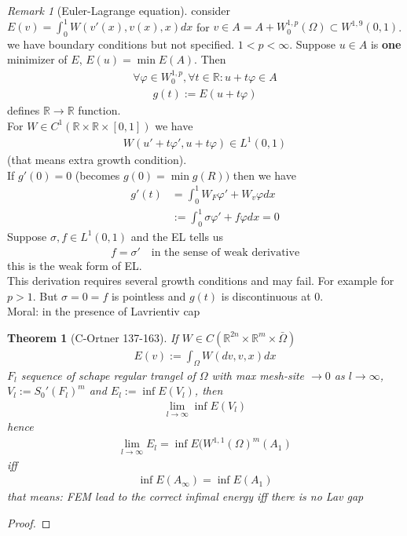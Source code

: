 \documentclass[a4paper,12pt,oneside,fleqn]{book}
\newtheorem{theorem}{Theorem}[section]
\theoremstyle{definition}
\theoremstyle{remark}
\newtheorem*{remark}{Remark}
\begin{document}
\begin{remark}[Euler-Lagrange equation]
	consider $E(v) = \int_0^1 W(v'(x), v(x), x)dx$ for $v \in A = A + W_0^{1, p}(\Omega) \subset W^{1, 9}(0, 1)$. 
	we have boundary conditions but not specified. $1 < p < \infty$. Suppose $u \in A$ is \textbf{one} minimizer of $E$, $E(u) = \min E(A)$. Then
	\begin{align*}
		\forall \varphi \in W^{1, p}_0, \forall t \in \mathbb{R}:
		u + t\varphi \in A
	\end{align*}
	\begin{align*}
		g(t) := E(u + t \varphi)
	\end{align*}
    defines $\mathbb{R} \rightarrow \mathbb{R}$ function. \\
	For $W \in C^1(\mathbb{R} \times \mathbb{R} \times [0, 1])$ we have
	\begin{align*}
		W(u' + t \varphi', u + t \varphi) \in L^1(0, 1)
	\end{align*}
	(that means extra growth condition). \\
	If $g'(0) = 0$ (becomes $g(0) = \min g(R))$ then we have
	\begin{align*}
		g'(t) &= \int_0^1 W_F \varphi' + W_v \varphi dx\\
		&:= \int_0^1 \sigma \varphi' + f \varphi  dx = 0
	\end{align*}
	Suppose $\sigma, f \in L^1(0, 1)$ and the EL tells us
	\begin{align*}
		f = \sigma' \quad \text{in the sense of weak derivative}
	\end{align*}
	this is the weak form of EL. \\
	This derivation requires several growth conditions and may fail. For example for $p > 1$. But $\sigma = 0 = f$ is pointless and $g(t)$ is discontinuous at 0. \\
	Moral: in the presence of Lavrientiv cap 
\end{remark}

\begin{theorem}[C-Ortner 137-163]
	If $W \in C(\mathbb{R}^{2n} \times \mathbb{R}^m \times \bar{\Omega})$ 
	\begin{align*}
		E(v):= \int_\Omega W(dv, v, x)dx
	\end{align*}
	$F_l$ sequence of schape regular trangel of $\Omega$ with max mesh-site $\rightarrow 0$ as $l \rightarrow \infty$, $V_l:= S_0'(F_l)^m$ and
	$E_l:= \inf E(V_l)$, then
	\begin{align*}
		\lim_{l \rightarrow \infty} \inf E(V_l)
	\end{align*}
	hence
	\begin{align*}
		\lim_{ l\rightarrow \infty} E_l = \inf E(W^{1, 1}(\Omega)^m(A_1)
	\end{align*}
	iff
	\begin{align*}
		\inf E(A_\infty) = \inf E(A_1)
	\end{align*}
	that means: FEM lead to the correct infimal energy iff there is no Lav gap
\end{theorem}
\begin{proof}
\end{proof}
\end{document}

